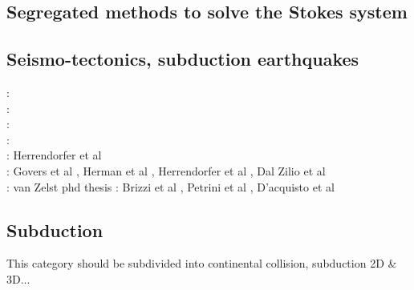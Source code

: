 \subsection{Segregated methods to solve the Stokes system}

\begin{scriptsize}
\cite{raju91}
\cite{haeh93}
\cite{leru95}
\cite{duto98}
\cite{wade03}
\cite{wade04}
\cite{utne08}
\end{scriptsize}

\subsection{Seismo-tectonics, subduction earthquakes}

\begin{scriptsize}
\twothousandthree: \cite{bocs03}\\
\twothousandtwelve: \cite{wahh12}\\
\twothousandthirteen: \cite{vagd13a,vagd13b}\cite{milp13}\cite{myhi13}\\
\twothousandfourteen: \cite{vamd14}\\
\twothousandfifteen: Herrendorfer et al \cite{hevg15}\\
\twothousandeighteen: Govers et al \cite{gofv18}, Herman et al \cite{hefg18}, Herrendorfer et al \cite{hegv18}, Dal Zilio et al \cite{davg18}\\
\twothousandnineteen: \cite{vawg19} van Zelst phd thesis \cite{vanzelst}
\twothousandtwenty: Brizzi et al \cite{brvf20}, Petrini et al \cite{pegy20}, D'acquisto et al \cite{dadm20}
\end{scriptsize}

\subsection{Subduction} 
This category should be subdivided into continental collision, subduction 2D \& 3D...

